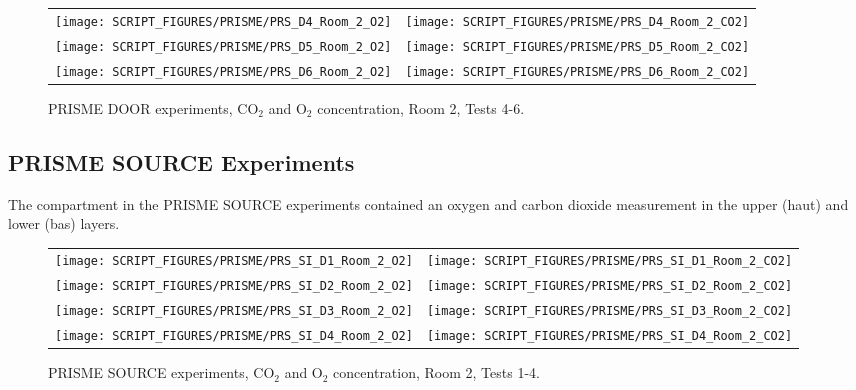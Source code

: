 \begin{figure}[p]
\begin{tabular*}{\textwidth}{l@{\extracolsep{\fill}}r}
\texttt{[image: SCRIPT\_FIGURES/PRISME/PRS\_D4\_Room\_2\_O2]} &
\texttt{[image: SCRIPT\_FIGURES/PRISME/PRS\_D4\_Room\_2\_CO2]} \\
\texttt{[image: SCRIPT\_FIGURES/PRISME/PRS\_D5\_Room\_2\_O2]} &
\texttt{[image: SCRIPT\_FIGURES/PRISME/PRS\_D5\_Room\_2\_CO2]} \\
\texttt{[image: SCRIPT\_FIGURES/PRISME/PRS\_D6\_Room\_2\_O2]} &
\texttt{[image: SCRIPT\_FIGURES/PRISME/PRS\_D6\_Room\_2\_CO2]}
\end{tabular*}
\caption{PRISME DOOR experiments, CO$_2$ and O$_2$ concentration, Room 2, Tests 4-6.}
\label{PRISME_Gas_4}
\end{figure}

\clearpage

\subsection{PRISME SOURCE Experiments}

The compartment in the PRISME SOURCE experiments contained an oxygen and carbon dioxide measurement in the upper (haut) and lower (bas) layers.

\begin{figure}[!ht]
\begin{tabular*}{\textwidth}{l@{\extracolsep{\fill}}r}
\texttt{[image: SCRIPT\_FIGURES/PRISME/PRS\_SI\_D1\_Room\_2\_O2]} &
\texttt{[image: SCRIPT\_FIGURES/PRISME/PRS\_SI\_D1\_Room\_2\_CO2]} \\
\texttt{[image: SCRIPT\_FIGURES/PRISME/PRS\_SI\_D2\_Room\_2\_O2]} &
\texttt{[image: SCRIPT\_FIGURES/PRISME/PRS\_SI\_D2\_Room\_2\_CO2]} \\
\texttt{[image: SCRIPT\_FIGURES/PRISME/PRS\_SI\_D3\_Room\_2\_O2]} &
\texttt{[image: SCRIPT\_FIGURES/PRISME/PRS\_SI\_D3\_Room\_2\_CO2]} \\
\texttt{[image: SCRIPT\_FIGURES/PRISME/PRS\_SI\_D4\_Room\_2\_O2]} &
\texttt{[image: SCRIPT\_FIGURES/PRISME/PRS\_SI\_D4\_Room\_2\_CO2]}
\end{tabular*}
\caption{PRISME SOURCE experiments, CO$_2$ and O$_2$ concentration, Room 2, Tests 1-4.}
\label{PRISME_SOURCE_Gas_1}
\end{figure}


